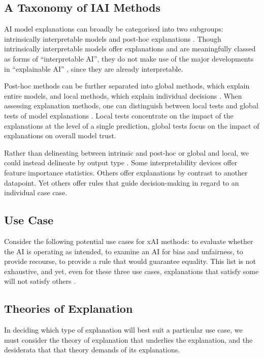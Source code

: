 \subsection{A Taxonomy of IAI Methods}
AI model explanations can broadly be categorised into two subgroups: intrinsically interpretable models and post-hoc explanations \cite{molnar_interpretable_2019}. Though intrinsically interpretable models offer explanations and are meaningfully classed as forms of “interpretable AI”, they do not make use of the major developments in “explainable AI” \cite{molnar_interpretable_2019}, since they are already interpretable.

Post-hoc methods can be further separated into global methods, which explain entire models, and local methods, which explain individual decisions \cite{molnar_interpretable_2019}. When assessing explanation methods, one can distinguish between local tests and global tests of model explanations \cite{molnar_interpretable_2019}. Local tests concentrate on the impact of the explanations at the level of a single prediction, global tests focus on the impact of explanations on overall model trust.

Rather than delineating between intrinsic and post-hoc or global and local, we could instead delineate by output type \cite{friedrich_taxonomy_2011}. Some interpretability devices offer feature importance statistics. Others offer explanations by contrast to another datapoint. Yet others offer rules that guide decision-making in regard to an individual case case.

\subsection{Use Case}
Consider the following potential use cases for xAI methods: to evaluate whether the AI is operating as intended, to examine an AI for bias and unfairness, to provide recourse, to provide a rule that would guarantee equality. This list is not exhaustive, and yet, even for these three use cases, explanations that satisfy some will not satisfy others \cite{natarajan_trust_2023}.

\subsection{Theories of Explanation}
In deciding which type of explanation will best suit a particular use case, we must consider the theory of explanation that underlies the explanation, and the desiderata that that theory demands of its explanations.

